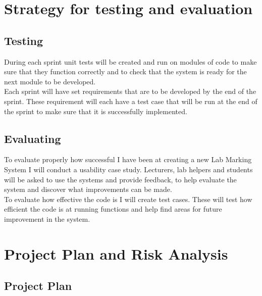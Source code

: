 \documentclass[12pt]{article}  %
\begin{document}
\setcounter{requirement}{1}




\newpage


\section{Strategy for testing and evaluation}


\subsection{Testing}
During each sprint unit tests will be created and run on modules of code to make sure that they function correctly and to check that the system is ready for the next module to be developed.\\
Each sprint will have set requirements that are to be developed by the end of the sprint. These requirement will each have a test case that will be run at the end of the sprint to make sure that it is successfully implemented.


\subsection{Evaluating}
To evaluate properly how successful I have been at creating a new Lab Marking System I will conduct a usability case study. Lecturers, lab helpers and students will be asked to use the systems and provide feedback, to help evaluate the system and discover what improvements can be made.\\
To evaluate how effective the code is I will create test cases. These will test how efficient the code is at running functions and help find areas for future improvement in the system.





\newpage
\section{Project Plan and Risk Analysis}


\subsection{Project Plan}
\end{document}

